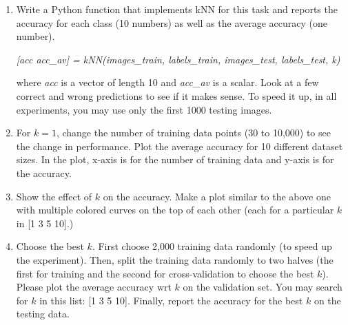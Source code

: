 \documentclass[fleqn]{article}
\begin{document}
\begin{enumerate}


	\item Write a Python function that implements kNN for this task and reports the accuracy for each class (10 numbers) as well as the average accuracy (one number).

		      {\em [acc acc\_av] = kNN(images\_train, labels\_train, images\_test, labels\_test, k)}

	      where {\em acc} is a vector of length 10 and {\em acc\_av} is a scalar. Look at a few correct and wrong predictions to see if it makes sense. To speed it up, in all experiments, you may use only the first 1000 testing images.

	\item For $k=1$, change the number of training data points (30 to 10,000) to see the change in performance. Plot the average accuracy for 10 different dataset sizes. In the plot, x-axis is for the number of training data and y-axis is for the accuracy.

	\item Show the effect of $k$ on the accuracy. Make a plot similar to the above one with multiple colored curves on the top of each other (each for a particular $k$ in [1 3 5 10].)

	\item Choose the best $k$. First choose 2,000 training data randomly (to speed up the experiment). Then, split the training data randomly to two halves (the first for training and the second for cross-validation to choose the best $k$). Please plot the average accuracy wrt $k$ on the validation set. You may search for $k$ in this list: [1 3 5 10]. Finally, report the accuracy for the best $k$ on the testing data.

\end{enumerate}
\end{document}
